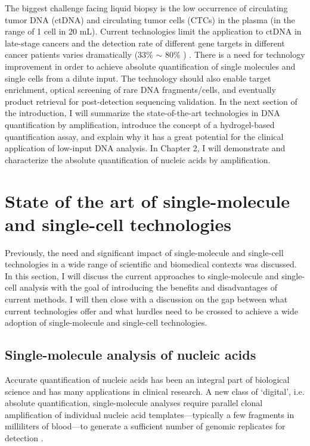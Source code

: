 The biggest challenge facing liquid biopsy is the low occurrence of circulating tumor DNA (ctDNA) and circulating tumor cells (CTCs) in the plasma (in the range of 1 cell in 20 mL). 
Current technologies limit the application to ctDNA in late-stage cancers and the detection rate of different gene targets in different cancer patients varies dramatically (33\% $\sim$ 80\% ) \cite{Esteller:1999tqa,Ma:2015ia}. There is a need for technology improvement in order to achieve absolute quantification of single molecules and single cells from a dilute input. The technology should also enable target enrichment, optical screening of rare DNA fragments/cells, and eventually product retrieval for post-detection sequencing validation. In the next section of the introduction, I will summarize the state-of-the-art technologies in DNA quantification by amplification, introduce the concept of a hydrogel-based quantification assay, and explain why it has a great potential for the clinical application of low-input DNA analysis. In Chapter 2, I will demonstrate and characterize the absolute quantification of nucleic acids by amplification. 
\section{State of the art of single-molecule and single-cell technologies}
Previously, the need and significant impact of single-molecule and single-cell technologies in a wide range of scientific and biomedical contexts was discussed. In this section, I will discuss the current approaches to single-molecule and single-cell analysis with the goal of introducing the benefits and disadvantages of current methods. I will then close with a discussion on the gap between what current technologies offer and what hurdles need to be crossed to achieve a wide adoption of single-molecule and single-cell technologies. 

\subsection{Single-molecule analysis of nucleic acids}
Accurate quantification of nucleic acids has been an integral part of biological science and has many applications in clinical research. A new class of `digital', i.e. absolute quantification, single-molecule analyses require parallel clonal amplification of individual nucleic acid templates---typically a few fragments in milliliters of blood---to generate a sufficient number of genomic replicates for detection \cite{Cochran:2014cn,Jennings:2014et,Zou:2017dq,Lun:2008cp,Lo:2007hb,Vogelstain:1999ve,Sykes:1992tm}. 

